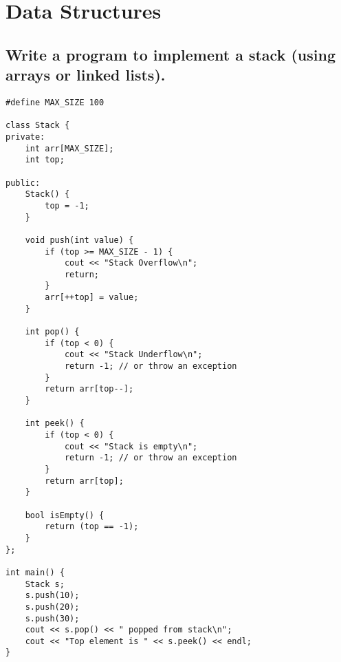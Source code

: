 \section{Data Structures}

\subsection{Write a program to implement a stack (using arrays or linked lists).}
\begin{tcolorbox}[title=]
\begin{verbatim}
#define MAX_SIZE 100

class Stack {
private:
    int arr[MAX_SIZE];
    int top;

public:
    Stack() {
        top = -1;
    }

    void push(int value) {
        if (top >= MAX_SIZE - 1) {
            cout << "Stack Overflow\n";
            return;
        }
        arr[++top] = value;
    }

    int pop() {
        if (top < 0) {
            cout << "Stack Underflow\n";
            return -1; // or throw an exception
        }
        return arr[top--];
    }

    int peek() {
        if (top < 0) {
            cout << "Stack is empty\n";
            return -1; // or throw an exception
        }
        return arr[top];
    }

    bool isEmpty() {
        return (top == -1);
    }
};

int main() {
    Stack s;
    s.push(10);
    s.push(20);
    s.push(30);
    cout << s.pop() << " popped from stack\n";
    cout << "Top element is " << s.peek() << endl;
}    
\end{verbatim}
\end{tcolorbox}

